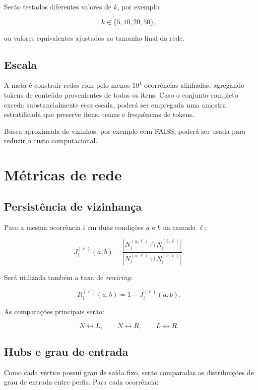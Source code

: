 \documentclass[11pt,a4paper]{article}
\begin{document}
Serão testados diferentes valores de $k$, por exemplo:

\[
k \in \{5,10,20,50\},
\]

ou valores equivalentes ajustados ao tamanho final da rede.

\subsection{Escala}

A meta é construir redes com pelo menos $10^4$ ocorrências alinhadas, agregando tokens de conteúdo provenientes de todos os itens. Caso o conjunto completo exceda substancialmente essa escala, poderá ser empregada uma amostra estratificada que preserve itens, temas e frequências de tokens.

Busca aproximada de vizinhos, por exemplo com FAISS, poderá ser usada para reduzir o custo computacional.

\section{Métricas de rede}

\subsection{Persistência de vizinhança}

Para a mesma ocorrência $i$ em duas condições $a$ e $b$ na camada $\ell$:

\[
J_i^{(\ell)}(a,b)
=
\frac{
|N_i^{(a,\ell)} \cap N_i^{(b,\ell)}|
}{
|N_i^{(a,\ell)} \cup N_i^{(b,\ell)}|
}.
\]

Será utilizada também a taxa de \emph{rewiring}:

\[
R_i^{(\ell)}(a,b)=1-J_i^{(\ell)}(a,b).
\]

As comparações principais serão:

\[
N \leftrightarrow L,
\qquad
N \leftrightarrow R,
\qquad
L \leftrightarrow R.
\]

\subsection{Hubs e grau de entrada}

Como cada vértice possui grau de saída fixo, serão comparadas as distribuições de grau de entrada entre perfis. Para cada ocorrência:
\end{document}
